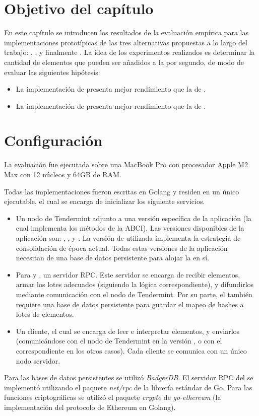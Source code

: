 \section{Objetivo del capítulo}\label{sec:benchmark}
En este capítulo se introducen los resultados de la evaluación empírica para las implementaciones
prototípicas de las tres alternativas propuestas a lo largo del trabajo: \vanilla, \compresschain,
y finalmente \hashchain.
La idea de los experimentos realizados es determinar la cantidad de elementos que pueden ser
añadidos a la \setchain por segundo, de modo de evaluar las siguientes hipótesis:
\begin{itemize}
	\item La implementación de \compresschain presenta mejor rendimiento que la de \vanilla.
	\item La implementación de \hashchain presenta mejor rendimiento que la de \compresschain.
\end{itemize}

\section{Configuración}
%
La evaluación fue ejecutada sobre una MacBook Pro con procesador Apple M2 Max
con 12 núcleos y 64GB de RAM.

%
Todas las implementaciones fueron escritas en Golang y residen en un único ejecutable, el cual se encarga
de inicializar los siguiente servicios.
\begin{itemize}
	\item Un nodo de Tendermint adjunto a una versión específica de la aplicación (la cual implementa los métodos
	de la ABCI). Las versiones disponibles de la aplicación son: \vanilla, \compresschain, y \hashchain.
	La versión de \hashchain utilizada implementa la estrategia de consolidación de época actual.
	Todas estas versiones de la 
	aplicación necesitan de una base de datos persistente para alojar la \setchain en sí.
	\item Para \compresschain y \hashchain, un servidor \collector RPC. Este servidor se encarga de recibir elementos,
	armar los lotes adecuados (siguiendo la lógica correspondiente), y difundirlos mediante comunicación con el nodo
	de Tendermint. Por su parte, el \hcollector también requiere una base de datos persistente para guardar el mapeo de
	hashes a lotes de elementos.
	\item Un cliente, el cual se encarga de leer e interpretar elementos, y enviarlos (comunicándose con el nodo de
	Tendermint en la versión \vanilla, o con el \collector correspondiente en los otros casos). Cada cliente se comunica
	con un único nodo servidor.
\end{itemize}
Para las bases de datos persistentes se utilizó \textit{BadgerDB}\cite{db.badger}.
El servidor RPC del \collector se implementó utilizando el paquete \textit{net/rpc} de la librería estándar de Go.
Para las funciones criptográficas se utilizó el paquete \textit{crypto} de \textit{go-ethereum} (la implementación
del protocolo de Ethereum en Golang). 

